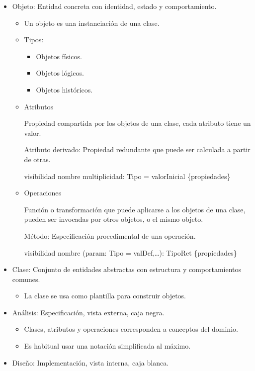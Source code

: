 \documentclass[12pt, twoside, openright]{report} %
\begin{document}
\begin{itemize}
	\item Objeto: Entidad concreta con identidad, estado y comportamiento.

	      \begin{itemize}
		      \item Un objeto es una instanciación de una clase.
		      \item Tipos:

		            \begin{itemize}
			            \item Objetos físicos.
			            \item Objetos lógicos.
			            \item Objetos históricos.
		            \end{itemize}
		      \item Atributos

		            Propiedad compartida por los objetos de una clase, cada atributo
		            tiene un valor.

		            Atributo derivado: Propiedad redundante que puede ser calculada
		            a partir de otras.

		            visibilidad nombre multiplicidad: Tipo = valorInicial
		            \{propiedades\}
		      \item Operaciones

		            Función o transformación que puede aplicarse a los objetos de
		            una clase, pueden ser invocadas por otros objetos, o el mismo
		            objeto.

		            Método: Especificación procedimental de una operación.

		            visibilidad nombre (param: Tipo = valDef,\ldots): TipoRet
		            \{propiedades\}
	      \end{itemize}
	\item Clase: Conjunto de entidades abstractas con estructura y
	      comportamientos comunes.

	      \begin{itemize}
		      \item La clase se usa como plantilla para construir objetos.
	      \end{itemize}
	\item Análisis: Especificación, vista externa, caja negra.

	      \begin{itemize}
		      \item Clases, atributos y operaciones corresponden a conceptos del
		            dominio.
		      \item Es habitual usar una notación simplificada al máximo.
	      \end{itemize}
	\item Diseño: Implementación, vista interna, caja blanca.


\end{itemize}
\end{document}
